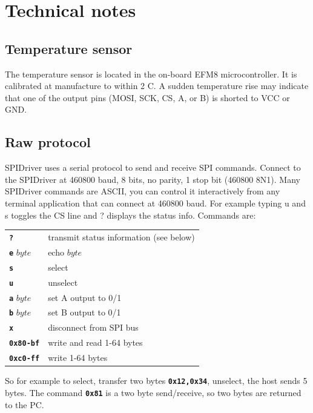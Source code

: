 \documentclass{article}
\newcommand{\mach}[1]{\texttt{\textbf{#1}}}
\newcommand{\gap}{\vspace{10pt}}
\begin{document}
\newpage
\section{Technical notes}



\subsection{Temperature sensor}

The temperature sensor is located in the on-board EFM8 microcontroller.
It is calibrated at manufacture to within 2 C.
A sudden temperature rise may indicate that one of the output pins (MOSI, SCK, CS, A, or B) is shorted to VCC or GND.

\subsection{Raw protocol}

SPIDriver uses a serial protocol to send and receive SPI commands.
Connect to the SPIDriver at 460800 baud, 8 bits, no parity, 1 stop bit (460800 8N1).
Many SPIDriver commands are ASCII, you can control it
interactively from any terminal application that can connect at 460800
baud. For example typing u and s toggles the CS line and ? displays the
status info.
Commands are:

\gap\begin{tabular}{ll}
\hline
\mach{?}        & transmit status information (see below)        \\
\mach{e} $byte$ & echo $byte$       \\
\mach{s}        & select        \\
\mach{u}        & unselect        \\
\mach{a} $byte$ & set A output to 0/1       \\
\mach{b} $byte$ & set B output to 0/1       \\
\mach{x}        & disconnect from SPI bus       \\
\mach{0x80-bf}  & write and read 1-64 bytes       \\
\mach{0xc0-ff}  & write 1-64 bytes        \\ \hline
\end{tabular}\gap

So for example to select, transfer two bytes
\mach{0x12,0x34},
unselect, the host sends 5 bytes.
The command \mach{0x81} is a two byte send/receive, so two bytes are returned to the PC.
\end{document}
